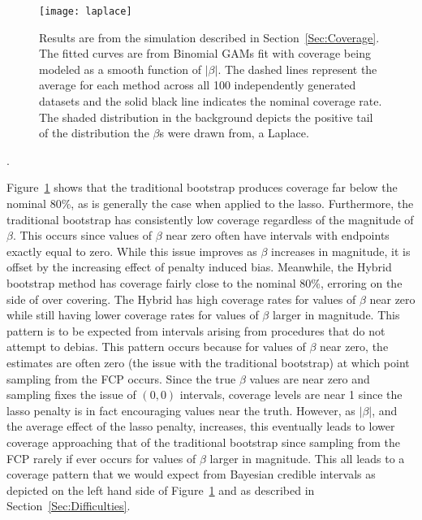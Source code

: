 \begin{figure}[hbtp]
  \begin{center}
  \texttt{[image: laplace]}
  \caption{\label{Fig:laplace} Results are from the simulation described in Section~\ref{Sec:Coverage}. The fitted curves are from Binomial GAMs fit with coverage being modeled as a smooth function of $|\beta|$. The dashed lines represent the average for each method across all 100 independently generated datasets and the solid black line indicates the nominal coverage rate. The shaded distribution in the background depicts the positive tail of the distribution the $\beta$s were drawn from, a Laplace.}
  \end{center}
\end{figure}

.

Figure~\ref{Fig:laplace} shows that the traditional bootstrap produces coverage far below the nominal 80\%, as is generally the case when applied to the lasso. Furthermore, the traditional bootstrap has consistently low coverage regardless of the magnitude of $\beta$. This occurs since values of $\beta$ near zero often have intervals with endpoints exactly equal to zero. While this issue improves as $\beta$ increases in magnitude, it is offset by the increasing effect of penalty induced bias. Meanwhile, the Hybrid bootstrap method has coverage fairly close to the nominal 80\%, erroring on the side of over covering. The Hybrid has high coverage rates for values of $\beta$ near zero while still having lower coverage rates for values of $\beta$ larger in magnitude. This pattern is to be expected from intervals arising from procedures that do not attempt to debias. This pattern occurs because for values of $\beta$ near zero, the estimates are often zero (the issue with the traditional bootstrap) at which point sampling from the FCP occurs. Since the true $\beta$ values are near zero and sampling fixes the issue of $(0, 0)$ intervals, coverage levels are near 1 since the lasso penalty is in fact encouraging values near the truth. However, as $|\beta|$, and the average effect of the lasso penalty, increases, this eventually leads to lower coverage approaching that of the traditional bootstrap since sampling from the FCP rarely if ever occurs for values of $\beta$ larger in magnitude. This all leads to a coverage pattern that we would expect from Bayesian credible intervals as depicted on the left hand side of Figure~\ref{Fig:laplace} and as described in Section~\ref{Sec:Difficulties}.

